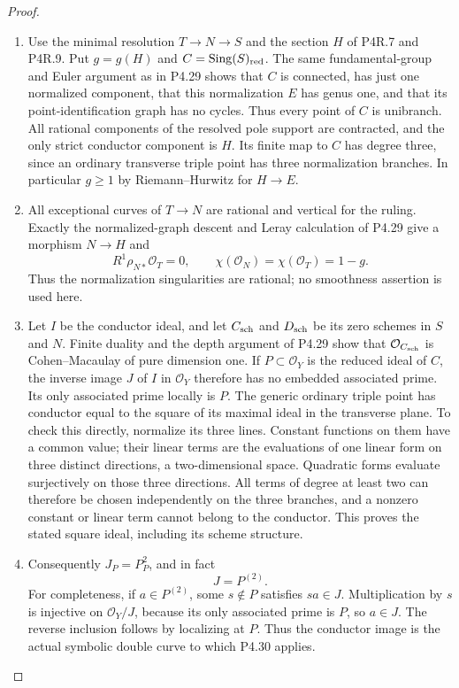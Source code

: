 \begin{proof}

\begin{enumerate}[label={$\langle1\rangle$\arabic*.},leftmargin=*]
\item Use the minimal resolution $T\to N\to S$ and the section $H$
of P4R.7 and P4R.9. Put $g=g(H)$ and
$C=\operatorname{Sing}(S)_{\rm red}$.
The same fundamental-group and Euler argument as in P4.29
shows that $C$ is connected, has just one normalized
component, that this normalization $E$ has genus one, and
that its point-identification graph has no cycles. Thus
every point of $C$ is unibranch. All rational components
of the resolved pole support are contracted, and the
only strict conductor component is $H$. Its finite map
to $C$ has degree three, since an ordinary transverse
triple point has three normalization branches.
In particular $g\ge1$ by Riemann--Hurwitz for $H\to E$.

\item All exceptional curves of $T\to N$ are rational and
vertical for the ruling. Exactly the normalized-graph
descent and Leray calculation of P4.29 give a morphism
$N\to H$ and
\[
 R^1\rho_{N*}\mathcal O_T=0,\qquad
 \chi(\mathcal O_N)=\chi(\mathcal O_T)=1-g.
\]
Thus the normalization singularities are rational; no
smoothness assertion is used here.

\item Let $I$ be the conductor ideal, and let $C_{\rm sch}$
and $D_{\rm sch}$ be its zero schemes in $S$ and $N$.
Finite duality and the depth argument of P4.29 show that
$\mathcal O_{C_{\rm sch}}$ is Cohen--Macaulay of pure
dimension one. If $P\subset\mathcal O_Y$ is the reduced
ideal of $C$, the inverse image $J$ of $I$ in
$\mathcal O_Y$ therefore has no embedded associated
prime. Its only associated prime locally is $P$.
The generic ordinary triple point has conductor equal
to the square of its maximal ideal in the transverse
plane. To check this directly, normalize its three
lines. Constant functions on them have a common value;
their linear terms are the evaluations of one linear
form on three distinct directions, a two-dimensional
space. Quadratic forms evaluate surjectively on those
three directions. All terms of degree at least two
can therefore be chosen independently on the three
branches, and a nonzero constant or linear term cannot
belong to the conductor. This proves the stated square
ideal, including its scheme structure.

\item Consequently $J_P=P_P^2$, and in fact
\[
 J=P^{(2)}.
\]
For completeness, if $a\in P^{(2)}$, some $s\notin P$
satisfies $sa\in J$. Multiplication by $s$ is injective
on $\mathcal O_Y/J$, because its only associated prime
is $P$, so $a\in J$. The reverse inclusion follows by
localizing at $P$. Thus the conductor image is the
actual symbolic double curve to which P4.30 applies.


\end{enumerate}
\end{proof}
